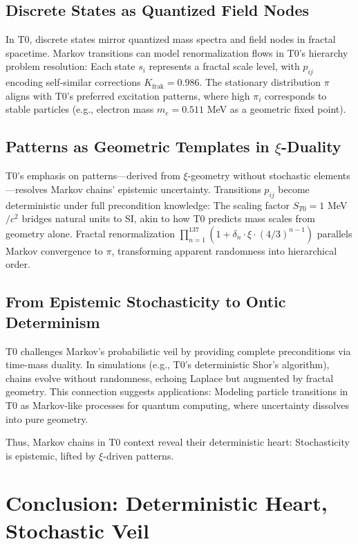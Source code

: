 \documentclass[12pt,a4paper]{article}
\begin{document}
	\subsection{Discrete States as Quantized Field Nodes}
	In T0, discrete states mirror quantized mass spectra and field nodes in fractal spacetime. Markov transitions can model renormalization flows in T0's hierarchy problem resolution: Each state $s_i$ represents a fractal scale level, with $p_{ij}$ encoding self-similar corrections $K_{\text{frak}} = 0.986$. The stationary distribution $\pi$ aligns with T0's preferred excitation patterns, where high $\pi_i$ corresponds to stable particles (e.g., electron mass $m_e = 0.511$ MeV as a geometric fixed point).
	
	\subsection{Patterns as Geometric Templates in $\xi$-Duality}
	T0's emphasis on patterns—derived from $\xi$-geometry without stochastic elements—resolves Markov chains' epistemic uncertainty. Transitions $p_{ij}$ become deterministic under full precondition knowledge: The scaling factor $S_{T0} = 1$ MeV$/c^2$ bridges natural units to SI, akin to how T0 predicts mass scales from geometry alone. Fractal renormalization $\prod_{n=1}^{137} (1 + \delta_n \cdot \xi \cdot (4/3)^{n-1})$ parallels Markov convergence to $\pi$, transforming apparent randomness into hierarchical order.
	
	\subsection{From Epistemic Stochasticity to Ontic Determinism}
	T0 challenges Markov's probabilistic veil by providing complete preconditions via time-mass duality. In simulations (e.g., T0's deterministic Shor's algorithm), chains evolve without randomness, echoing Laplace but augmented by fractal geometry. This connection suggests applications: Modeling particle transitions in T0 as Markov-like processes for quantum computing, where uncertainty dissolves into pure geometry.
	
	Thus, Markov chains in T0 context reveal their deterministic heart: Stochasticity is epistemic, lifted by $\xi$-driven patterns.
	
	\section{Conclusion: Deterministic Heart, Stochastic Veil}
	
\end{document}
